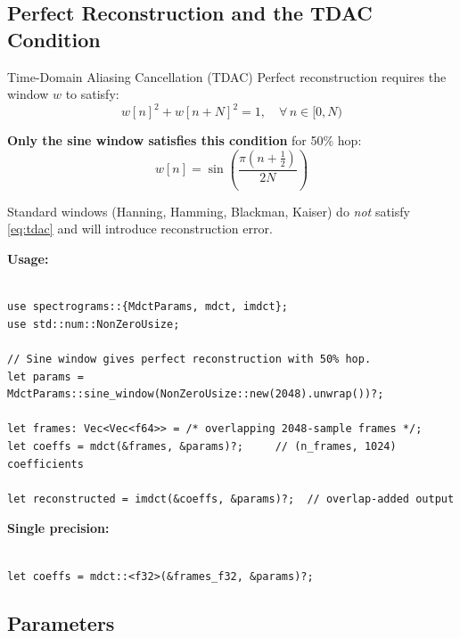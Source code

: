 \subsection{Perfect Reconstruction and the TDAC Condition}\label{subsec:mdct_pr}

\begin{concept}{Time-Domain Aliasing Cancellation (TDAC)}
  Perfect reconstruction requires the window $w$ to satisfy:
  \begin{equation}
    \label{eq:tdac}
    w[n]^2 + w[n+N]^2 = 1, \quad \forall\, n \in [0, N)
  \end{equation}

  \textbf{Only the sine window satisfies this condition} for 50\% hop:
  \begin{equation}
    \label{eq:sine_window}
    w[n] = \sin\!\left(\frac{\pi (n + \tfrac{1}{2})}{2N}\right)
  \end{equation}

  Standard windows (Hanning, Hamming, Blackman, Kaiser) do \emph{not}
  satisfy \cref{eq:tdac} and will introduce reconstruction error.
\end{concept}

\textbf{Usage:}

\begin{lstlisting}[caption={MDCT and IMDCT with sine-window reconstruction}]

use spectrograms::{MdctParams, mdct, imdct};
use std::num::NonZeroUsize;

// Sine window gives perfect reconstruction with 50% hop.
let params = MdctParams::sine_window(NonZeroUsize::new(2048).unwrap())?;

let frames: Vec<Vec<f64>> = /* overlapping 2048-sample frames */;
let coeffs = mdct(&frames, &params)?;     // (n_frames, 1024) coefficients

let reconstructed = imdct(&coeffs, &params)?;  // overlap-added output
\end{lstlisting}

\textbf{Single precision:}

\begin{lstlisting}[caption={MDCT at single-precision f32 via turbofish}]

let coeffs = mdct::<f32>(&frames_f32, &params)?;
\end{lstlisting}

\subsection{Parameters}\label{subsec:mdct_params}


